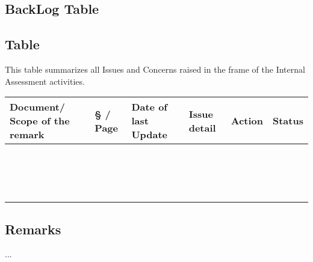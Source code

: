\documentclass{template/openetcs_article}
\begin{document}
\newpage
\begin{landscape}


\section{BackLog Table}

\subsection{Table}

This table summarizes all Issues and Concerns raised in the frame of the Internal Assessment activities.

\begin{tabular}{|p{}|p{}|p{}|p{8cm}|p{5cm}|p{2cm}|} 
\hline
\textbf{Document/ Scope of the remark} & \textbf{§ / Page} & \textbf{Date of last Update} & \textbf{Issue detail} & \textbf{Action} & \textbf{Status} \\ \hline
 & & & & & \\ \hline
 & & & & & \\ \hline
 & & & & & \\ \hline
 & & & & & \\ \hline
 & & & & & \\ \hline
 & & & & & \\ \hline
 & & & & & \\ \hline
 & & & & & \\ \hline
 & & & & & \\ \hline
 & & & & & \\ \hline
 & & & & & \\ \hline 
& & & & & \\ \hline
 & & & & & \\ \hline
 & & & & & \\ \hline
 & & & & & \\ \hline
 & & & & & \\ \hline
\end{tabular}

\subsection{Remarks}
...

\end{landscape}

\end{document}
